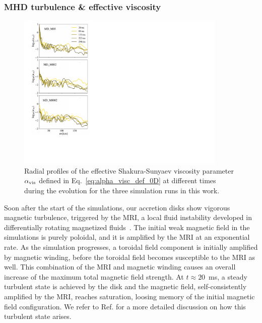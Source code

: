 \subsubsection{MHD turbulence \& effective viscosity}
\label{sec:viscosity}


\begin{figure}[t]
\centering
  \includegraphics[width=10cm]{figures/kilonova/alpha-viscosity.pdf}
 \caption{Radial profiles of the effective Shakura-Sunyaev viscosity parameter $\alpha_{\rm vis}$ defined in Eq.~\eqref{eq:alpha_visc_def_0D} at different times during the evolution for the three simulation runs in this work. \label{fig:alpha-viscosity}}
\vspace{5mm}
\end{figure}

Soon after the start of the simulations, our accretion disks show vigorous magnetic turbulence, triggered by the MRI, a local fluid instability developed in differentially rotating magnetized fluids~\cite{velikhov_notitle_1959,chandrasekhar_stability_1960,balbus_powerful_1991,balbus_instability_1998,balbus_enhanced_2003,armitage_dynamics_2011}. The initial weak magnetic field in the simulations is purely poloidal, and it is amplified by the MRI at an exponential rate. As the simulation progresses, a toroidal field component is initially amplified by magnetic winding, before the toroidal field becomes susceptible to the MRI as well. This combination of the MRI and magnetic winding causes an overall increase of the maximum total magnetic field strength. At $t\approx 20$~ms, a steady turbulent state is achieved by the disk and the magnetic field, self-consistently amplified by the MRI, reaches saturation, loosing memory of the initial magnetic field configuration. We refer to Ref. \cite{siegel_three-dimensional_2018} for a more detailed discussion on how this turbulent state arises.


